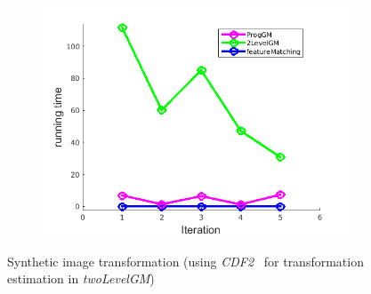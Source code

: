\documentclass[
	fontsize=12pt,
	paper=a4,
	twoside=false,
	numbers=noenddot,
	plainheadsepline,
	toc=listof,
	toc=bibliography
]{scrartcl}
\begin{document}
\begin{figure}[h]
\begin{subfigure}[b]{0.3\textwidth}
		\includegraphics[scale=0.25]{"fig_ver2608/RealImages/Img_trafo/no_descr/using_cdf_afftrafo/time"}  
	\end{subfigure} 	
	\caption{Synthetic image transformation (using \emph{CDF2}~\cite{Myronenko2009_CPD} for transformation estimation in \emph{twoLevelGM})}
\end{figure}
\FloatBarrier
\end{document}
